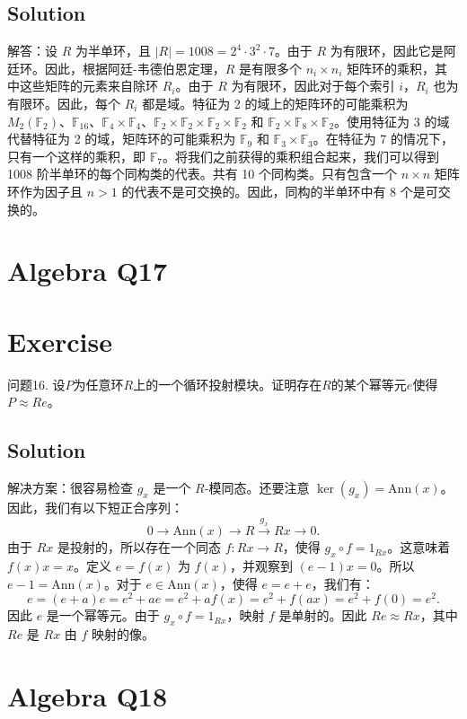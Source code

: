 \documentclass[12pt]{book}
\begin{document}
\subsection*{Solution}
解答：设 $R$ 为半单环，且 $|R|=1008=2^4\cdot3^2\cdot7$。由于 $R$ 为有限环，因此它是阿廷环。因此，根据阿廷-韦德伯恩定理，$R$ 是有限多个 $n_i\times n_i$ 矩阵环的乘积，其中这些矩阵的元素来自除环 $R_i$。由于 $R$ 为有限环，因此对于每个索引 $i$，$R_i$ 也为有限环。因此，每个 $R_i$ 都是域。特征为 2 的域上的矩阵环的可能乘积为 $M_2(\mathbb{F}_2)$、$\mathbb{F}_{16}$、$\mathbb{F}_4 \times \mathbb{F}_4$、$\mathbb{F}_2 \times \mathbb{F}_2 \times \mathbb{F}_2 \times \mathbb{F}_2$ 和 $\mathbb{F}_2 \times \mathbb{F}_8 \times \mathbb{F}_2$。使用特征为 3 的域代替特征为 2 的域，矩阵环的可能乘积为 $\mathbb{F}_9$ 和 $\mathbb{F}_3 \times \mathbb{F}_3$。在特征为 7 的情况下，只有一个这样的乘积，即 $\mathbb{F}_7$。将我们之前获得的乘积组合起来，我们可以得到 1008 阶半单环的每个同构类的代表。共有 10 个同构类。只有包含一个 $n \times n$ 矩阵环作为因子且 $n > 1$ 的代表不是可交换的。因此，同构的半单环中有 8 个是可交换的。
\newpage
\section{Algebra Q17}
\section*{Exercise}
问题16. 设$P$为任意环$R$上的一个循环投射模块。证明存在$R$的某个幂等元$e$使得$P \approx Re$。



\subsection*{Solution}
解决方案：很容易检查 $g_x$ 是一个 $R$-模同态。还要注意 $\ker(g_x) = \text{Ann}(x)$。因此，我们有以下短正合序列：
\[ 0 \to \text{Ann}(x) \to R \xrightarrow{g_x} Rx \to 0. \]
由于 $Rx$ 是投射的，所以存在一个同态 $f: Rx \to R$，使得 $g_x \circ f = 1_{Rx}$。这意味着 $f(x)x = x$。定义 $e = f(x)$ 为 $f(x)$，并观察到 $(e-1)x = 0$。所以 $e-1 = \text{Ann}(x)$。对于 $e \in \text{Ann}(x)$，使得 $e = e+e$，我们有：
\[ e = (e+a)e = e^2 + ae = e^2 + af(x) = e^2 + f(ax) = e^2 + f(0) = e^2. \]
因此 $e$ 是一个幂等元。由于 $g_x \circ f = 1_{Rx}$，映射 $f$ 是单射的。因此 $Re \approx Rx$，其中 $Re$ 是 $Rx$ 由 $f$ 映射的像。
\newpage
\section{Algebra Q18}
\end{document}

